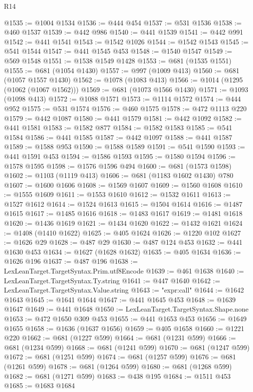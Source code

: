 \begin{lexlean}{R14}
\begin{coremodule}
@1535 := @1004 @1534
@1536 := @444 @454
@1537 := @531 @1536
@1538 := @460 @1537
@1539 := @442 @986
@1540 := @441 @1539
@1541 := @442 @991
@1542 := @441 @1541
@1543 := @1542 @1026
@1544 := @1542 @1543
@1545 := @541 @1544
@1547 := @441 @1545 @453
@1548 := @1540 @1547
@1549 := @569 @1548
@1551 := @1538 @1549 @1428
@1553 := @681 (@1535 @1551)
@1555 := @681 (@1054 @1430)
@1557 := @997 (@1009 @413)
@1560 := @681 (@1057 @1557 @1430)
@1562 := @1078 (@1083 @413)
@1566 := @1014 (@1295 (@1062 (@1067 @1562)))
@1569 := @681 (@1073 @1566 @1430)
@1571 := @1093 (@1098 @413)
@1572 := @1088 @1571
@1573 := @1114 @1572
@1574 := @444 @952
@1575 := @531 @1574
@1576 := @460 @1575
@1578 := @472 @1113 @220
@1579 := @442 @1087
@1580 := @441 @1579
@1581 := @442 @1092
@1582 := @441 @1581
@1583 := @1582 @877
@1584 := @1582 @1583
@1585 := @541 @1584
@1586 := @441 @1585
@1587 := @442 @1097
@1588 := @441 @1587
@1589 := @1588 @953
@1590 := @1588 @1589
@1591 := @541 @1590
@1593 := @441 @1591 @453
@1594 := @1586 @1593
@1595 := @1580 @1594
@1596 := @1578 @1595
@1598 := @1576 @1596 @494
@1600 := @681 (@1573 @1598)
@1602 := @1103 (@1119 @413)
@1606 := @681 (@1183 @1602 @1430) @780
@1607 := @1600 @1606
@1608 := @1569 @1607
@1609 := @1560 @1608
@1610 := @1555 @1609
@1611 := @1553 @1610
@1612 := @1532 @1611
@1613 := @1527 @1612
@1614 := @1524 @1613
@1615 := @1504 @1614
@1616 := @1487 @1615
@1617 := @1485 @1616
@1618 := @1483 @1617
@1619 := @1481 @1618
@1620 := @1436 @1619
@1621 := @1434 @1620
@1622 := @1432 @1621
@1624 := @1408 (@1410 @1622)
@1625 := @405 @1624
@1626 := @1220 @102
@1627 := @1626 @29
@1628 := @487 @29
@1630 := @487 @124 @453
@1632 := @441 @1630 @453
@1634 := @1627 (@1628 @1632)
@1635 := @405 @1634
@1636 := @1626 @196
@1637 := @487 @196
@1638 := LexLeanTarget.TargetSyntax.Prim.utf8Encode
@1639 := @461 @1638
@1640 := LexLeanTarget.TargetSyntax.Ty.string
@1641 := @447 @1640
@1642 := LexLeanTarget.TargetSyntax.Value.string
@1643 := "expr:call"
@1644 := @1642 @1643
@1645 := @1641 @1644
@1647 := @441 @1645 @453
@1648 := @1639 @1647
@1649 := @441 @1648
@1650 := LexLeanTarget.TargetSyntax.Shape.none
@1653 := @472 @1650 @309 @453
@1655 := @441 @1653 @453
@1656 := @1649 @1655
@1658 := @1636 (@1637 @1656)
@1659 := @405 @1658
@1660 := @1221 @220
@1662 := @681 (@1227 @599)
@1664 := @681 (@1231 @599)
@1666 := @681 (@1234 @599)
@1668 := @681 (@1241 @599)
@1670 := @681 (@1247 @599)
@1672 := @681 (@1251 @599)
@1674 := @681 (@1257 @599)
@1676 := @681 (@1261 @599)
@1678 := @681 (@1264 @599)
@1680 := @681 (@1268 @599)
@1682 := @681 (@1271 @599)
@1683 := @438 @195
@1684 := @1511 @453
@1685 := @1683 @1684

\end{coremodule}
\end{lexlean}

